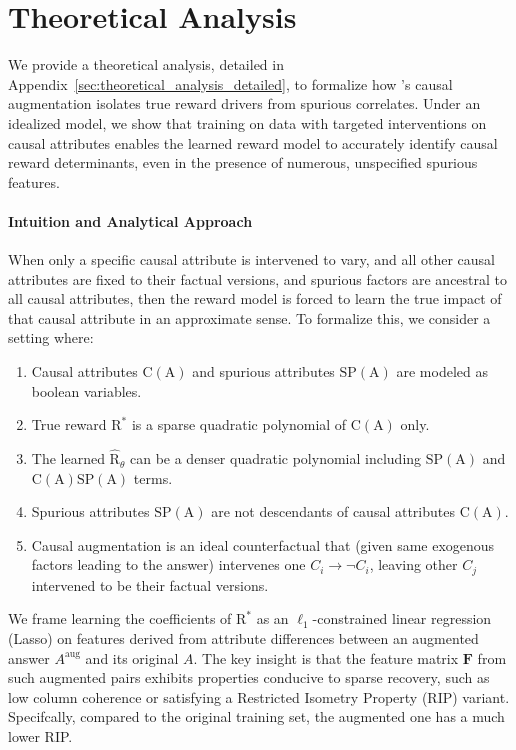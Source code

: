 \section{Theoretical Analysis}
\label{sec:theory}

We provide a theoretical analysis, detailed in Appendix~\ref{sec:theoretical_analysis_detailed}, to formalize how \carma{}'s causal augmentation isolates true reward drivers from spurious correlates. Under an idealized model, we show that training on data with targeted interventions on causal attributes enables the learned reward model to accurately identify causal reward determinants, even in the presence of numerous, unspecified spurious features.

\paragraph{Intuition and Analytical Approach}
When only a specific causal attribute is intervened to vary, and all other causal attributes are fixed to their factual versions, and spurious factors are ancestral to all causal attributes,  then the reward model is forced to learn the true impact of that causal attribute in an approximate sense.
To formalize this, we consider a setting where:

\begin{enumerate}[label=(\arabic*)]
    \item Causal attributes $\mathrm{C}(\mathrm{A})$ and spurious attributes $\mathrm{SP}(\mathrm{A})$ are modeled as boolean variables.
    \item True reward $\mathrm{R}^*$ is a sparse quadratic polynomial of $\mathrm{C}(\mathrm{A})$ only.
    \item The learned $\hat{\mathrm{R}}_\theta$ can be a denser quadratic polynomial including $\mathrm{SP}(\mathrm{A})$ and $\mathrm{C}(\mathrm{A})\mathrm{SP}(\mathrm{A})$ terms.
    \item Spurious attributes $\mathrm{SP}(\mathrm{A})$ are not descendants of causal attributes $\mathrm{C}(\mathrm{A})$.
    \item Causal augmentation is an ideal counterfactual that (given same exogenous factors leading to the answer)  intervenes one $C_i \to \neg C_i$, leaving other $C_j$ intervened to be their factual versions.
\end{enumerate}

\vspace{-0.1in}
We frame learning the coefficients  of $\mathrm{R}^*$ as an $\ell_1$-constrained linear regression (Lasso) on features derived from attribute differences between an augmented answer $A^{\mathrm{aug}}$ and its original $A$. The key insight is that the feature matrix $\mathbf{F}$ from such augmented pairs exhibits properties conducive to sparse recovery, such as low column coherence or satisfying a Restricted Isometry Property (RIP) variant. Specifcally, compared to the original training set, the augmented one has a much lower RIP.
\vspace{-0.2in}
